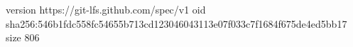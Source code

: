 version https://git-lfs.github.com/spec/v1
oid sha256:546b1fdc558fc54655b713cd123046043113e07f033c7f1684f675de4ed5bb17
size 806
